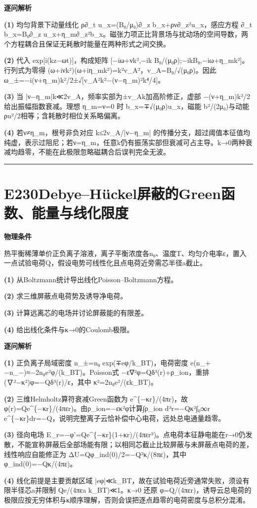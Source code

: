 \documentclass[UTF8,a4paper,11pt,oneside,openany]{ctexbook}
\begin{document}
\par\medskip\noindent\textbf{逐问解析}
\par\noindent\textbf{(1)} 均匀背景下动量线化 ρ∂\_t u\_x=(B₀/μ₀)∂\_z b\_x+ρν∂\_z²u\_x，感应方程 ∂\_t b\_x=B₀∂\_z u\_x+η\_m∂\_z²b\_x。磁张力项正比背景场与扰动场的空间导数，两个方程耦合且保证无耗散时能量在两种形式之间交换。
\par\noindent\textbf{(2)} 代入 exp[i(kz−ωt)]，构成矩阵 [−iω+νk²,−ik B₀/(μ₀ρ);−ikB₀,−iω+η\_mk²]。行列式为零得 (ω+iνk²)(ω+iη\_mk²)=k²v\_A²，v\_A=B₀/√(μ₀ρ)。因此 ω\_±=−i(ν+η\_m)k²/2±√[v\_A²k²−(ν−η\_m)²k⁴/4]。
\par\noindent\textbf{(3)} 当 |ν−η\_m|k≪2v\_A，频率实部为±v\_Ak加高阶修正，虚部 −(ν+η\_m)k²/2 给出振幅指数衰减。理想 η\_m=ν=0 时 b\_x=∓√(μ₀ρ)u\_x，磁能 b²/(2μ₀)与动能ρu²/2相等；含耗散时相位关系略偏离。
\par\noindent\textbf{(4)} 若ν≠η\_m，根号非负对应 k≤2v\_A/|ν−η\_m| 的传播分支，超过阈值本征值均纯虚，表示过阻尼；若ν=η\_m，任意k仍有振荡实部但衰减可占主导。k→0两种衰减均趋零，不能在此极限忽略磁耦合后误判完全无波。

\par\bigskip\hrule\bigskip
\section*{E230\quad Debye–Hückel屏蔽的Green函数、能量与线化限度}
\textbf{物理条件}\par 热平衡稀薄单价正负离子溶液，离子平衡浓度各n₀、温度T、均匀介电率ε，置入一点试验电荷Q，假设电势可线性化且点电荷近旁需芯半径a截止。
\par\noindent\textbf{(1)} 从Boltzmann统计导出线化Poisson–Boltzmann方程。
\par\noindent\textbf{(2)} 求三维屏蔽点电荷势及诱导净电荷。
\par\noindent\textbf{(3)} 计算远离芯的电场并讨论屏蔽能的有限差。
\par\noindent\textbf{(4)} 给出线化条件与κ→0的Coulomb极限。

\par\medskip\noindent\textbf{逐问解析}
\par\noindent\textbf{(1)} 正负离子局域密度 n\_±=n₀ exp(∓eφ/k\_BT)，电荷密度 e(n\_+−n\_−)≈−2n₀e²φ/(k\_BT)。Poisson式 −ε∇²φ=Qδ³(r)+ρ\_ion，重排 (∇²−κ²)φ=−Qδ³(r)/ε，其中 κ²=2n₀e²/(εk\_BT)。
\par\noindent\textbf{(2)} 三维Helmholtz算符衰减Green函数为 e\textasciicircum{}\{−κr\}/(4πr)，故 φ(r)=Qe\textasciicircum{}\{−κr\}/(4πεr)。由ρ\_ion=−εκ²φ计算∫ρ\_ion d³r=−Qκ²∫₀∞r e\textasciicircum{}\{−κr\}dr=−Q，说明完整离子云恰补偿中心电荷，远处总电通量趋零。
\par\noindent\textbf{(3)} 径向电场 E\_r=−φ'=Qe\textasciicircum{}\{−κr\}(1+κr)/(4πεr²)。点电荷本征静电能在r→0仍发散，不能宣称屏蔽后全部场能有限；以相同芯截止比较屏蔽与未屏蔽点电荷的差，线性响应自能修正为 ΔU=Qφ\_ind(0)/2=−Q²κ/(8πε)，其中 φ\_ind(0)=−Qκ/(4πε)。
\par\noindent\textbf{(4)} 线化前提是主要贡献区域 |eφ|≪k\_BT，故在试验电荷近旁通常失败，须设有限半径芯a并限制 Qe/(4πεa k\_BT)≪1。κ→0 还原 φ=Q/(4πεr)，诱导云总电荷的极限应按无穷体积与κ顺序理解，否则会误把逐点趋零的电荷密度与总积分混淆。
\end{document}
